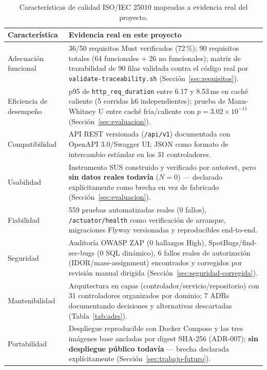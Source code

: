 \begin{table}[H]
\centering
\small
\begin{tabular}{p{2.6cm}p{9.5cm}}
\toprule
\textbf{Característica} & \textbf{Evidencia real en este proyecto} \\
\midrule
Adecuación funcional & 36/50 requisitos Must verificados (72\,\%); 90 requisitos totales (64
funcionales + 26 no funcionales); matriz de trazabilidad de 90 filas validada contra el código real por
\texttt{validate-traceability.sh} (Sección~\ref{sec:requisitos}). \\
Eficiencia de desempeño & p95 de \texttt{http\_req\_duration} entre 6.17 y 8.53\,ms en caché caliente
(5 corridas k6 independientes); prueba de Mann-Whitney U entre caché fría/caliente con
$p = 3.02\times10^{-11}$ (Sección~\ref{sec:evaluacion}). \\
Compatibilidad & API REST versionada (\texttt{/api/v1}) documentada con OpenAPI 3.0/Swagger UI; JSON como
formato de intercambio estándar en los 31 controladores. \\
Usabilidad & Instrumento SUS \cite{brooke1996} construido y verificado por autotest, pero \textbf{sin
datos reales todavía} ($N=0$) --- declarado explícitamente como brecha en vez de fabricado
(Sección~\ref{sec:evaluacion}). \\
Fiabilidad & 559 pruebas automatizadas reales (0 fallos), \texttt{/actuator/health} como verificación de
arranque, migraciones Flyway versionadas y reproducibles end-to-end. \\
Seguridad & Auditoría OWASP ZAP (0 hallazgos High), SpotBugs/find-sec-bugs (0 SQL dinámico), 6 fallos
reales de autorización (IDOR/mass-assignment) encontrados y corregidos por revisión manual dirigida
(Sección~\ref{sec:seguridad-corregida}). \\
Mantenibilidad & Arquitectura en capas (controlador/servicio/repositorio) con 31 controladores
organizados por dominio; 7 ADRs documentando decisiones y alternativas descartadas (Tabla~\ref{tab:adrs}). \\
Portabilidad & Despliegue reproducible con Docker Compose y las tres imágenes base ancladas por digest
SHA-256 (ADR-007); \textbf{sin despliegue público todavía} --- brecha declarada explícitamente
(Sección~\ref{sec:trabajo-futuro}). \\
\bottomrule
\end{tabular}
\caption{Características de calidad ISO/IEC 25010 mapeadas a evidencia real del proyecto.}
\label{tab:iso25010}
\end{table}


